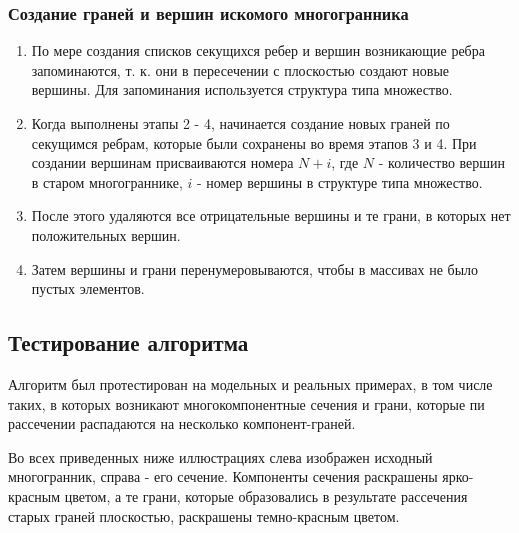 \documentclass[a4paper,12pt, titlepage]{article}
\begin{document}
\subsubsection{Создание граней и вершин искомого многогранника}	
	\begin{flushleft}
		\begin{enumerate}
			\item По мере создания списков секущихся ребер и вершин возникающие ребра запоминаются, 
			т. к. они в пересечении с плоскостью создают новые вершины. Для запоминания используется 
			структура типа множество. 
			\item Когда выполнены этапы 2 - 4, начинается создание новых граней по секущимся ребрам,
			которые были сохранены во время этапов 3 и 4. При создании вершинам присваиваются номера
			$N + i$, где $N$ - количество вершин в старом многограннике, $i$ - номер вершины в 
			структуре типа множество.
			\item После этого удаляются все отрицательные вершины и те грани, в которых нет 
			положительных вершин.
			\item Затем вершины и грани перенумеровываются, чтобы в массивах не было пустых элементов.
		\end{enumerate}
	\end{flushleft}

\subsection{Тестирование алгоритма}
	\begin{flushleft}
		Алгоритм был протестирован на модельных и реальных примерах, в том числе таких, в которых
		возникают многокомпонентные сечения и грани, которые пи рассечении распадаются на несколько
		компонент-граней.
	\end{flushleft}
	\begin{flushleft}
		Во всех приведенных ниже иллюстрациях слева изображен исходный многогранник, справа - его 
		сечение. Компоненты сечения раскрашены ярко-красным цветом, а те грани, которые образовались
		в результате рассечения старых граней плоскостью, раскрашены темно-красным цветом.
	\end{flushleft}

\newpage
\end{document}
